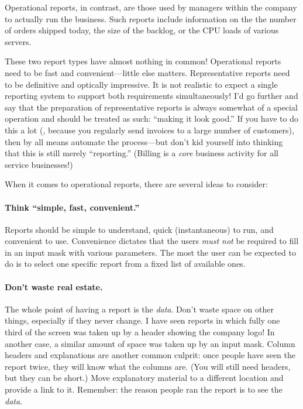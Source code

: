 Operational reports, in contrast, are those used by managers within
the company to actually run the business. Such reports include
information on the the number of orders shipped today, the size of the
backlog, or the CPU loads of various servers.

These two report types have almost nothing in common! Operational
reports need to be fast and convenient---little else matters.
Representative reports need to be definitive and optically impressive.
It is not realistic to expect a single reporting system to support
both requirements simultaneously! I'd go further and say that the
preparation of representative reports is always somewhat of a special
operation and should be treated as such: ``making it look good.'' If
you have to do this a lot (\eg, because you regularly send invoices to
a large number of customers), then by all means automate the
process---but don't kid yourself into thinking that this is still
merely ``reporting.'' (Billing is a \emph{core} business activity for
all service businesses!)

When it comes to operational reports, there are several ideas to
consider:

\paragraph{Think ``simple, fast, convenient.''}
Reports should be simple to understand, quick (instantaneous) to run,
and convenient to use.  Convenience dictates that the users \emph{must
  not} be required to fill in an input mask with various parameters.
The most the user can be expected to do is to select one specific
report from a fixed list of available ones.


\paragraph{Don't waste real estate.}
The whole point of having a report is the \emph{data}. Don't waste
space on other things, especially if they never change. I have seen
reports in which fully one third of the screen was taken up by a
header showing the company logo! In another case, a similar amount of
space was taken up by an input mask. Column headers and explanations
are another common culprit: once people have seen the report twice,
they will know what the columns are. (You will still need headers, but
they can be short.) Move explanatory material to a different location
and provide a link to it. Remember: the reason people ran the report
is to see the \emph{data}.

